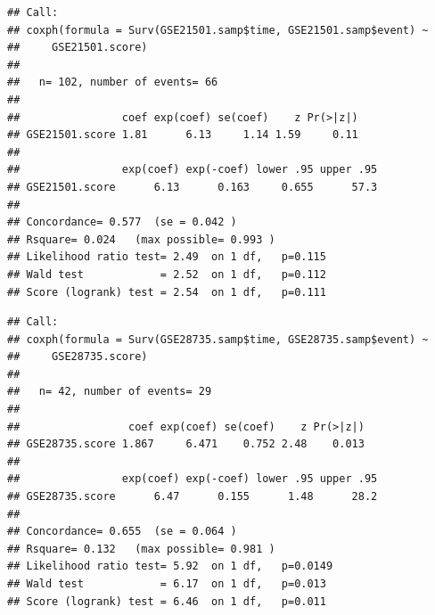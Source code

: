 \documentclass{article}
\begin{document}
\begin{knitrout}
\color{fgcolor}\begin{kframe}
\begin{alltt}
 \hlkwb{=} \hlstd{(}\hlopt{$}\hlopt{$} \hlopt{~} 
\end{alltt}
\begin{verbatim}
## Call:
## coxph(formula = Surv(GSE21501.samp$time, GSE21501.samp$event) ~ 
##     GSE21501.score)
## 
##   n= 102, number of events= 66 
## 
##                coef exp(coef) se(coef)    z Pr(>|z|)
## GSE21501.score 1.81      6.13     1.14 1.59     0.11
## 
##                exp(coef) exp(-coef) lower .95 upper .95
## GSE21501.score      6.13      0.163     0.655      57.3
## 
## Concordance= 0.577  (se = 0.042 )
## Rsquare= 0.024   (max possible= 0.993 )
## Likelihood ratio test= 2.49  on 1 df,   p=0.115
## Wald test            = 2.52  on 1 df,   p=0.112
## Score (logrank) test = 2.54  on 1 df,   p=0.111
\end{verbatim}
\begin{alltt}
 \hlkwb{=} \hlstd{(}\hlopt{$}\hlopt{$} \hlopt{~} 
\end{alltt}
\begin{verbatim}
## Call:
## coxph(formula = Surv(GSE28735.samp$time, GSE28735.samp$event) ~ 
##     GSE28735.score)
## 
##   n= 42, number of events= 29 
## 
##                 coef exp(coef) se(coef)    z Pr(>|z|)
## GSE28735.score 1.867     6.471    0.752 2.48    0.013
## 
##                exp(coef) exp(-coef) lower .95 upper .95
## GSE28735.score      6.47      0.155      1.48      28.2
## 
## Concordance= 0.655  (se = 0.064 )
## Rsquare= 0.132   (max possible= 0.981 )
## Likelihood ratio test= 5.92  on 1 df,   p=0.0149
## Wald test            = 6.17  on 1 df,   p=0.013
## Score (logrank) test = 6.46  on 1 df,   p=0.011
\end{verbatim}
\begin{alltt}
\hlstd{(}\hlstd{(}\hlopt{$}\hlopt{$} \hlopt{~}  \hlopt{+} 
\end{alltt}
\begin{verbatim}

\end{verbatim}
\end{kframe}
\end{knitrout}
\end{document}
